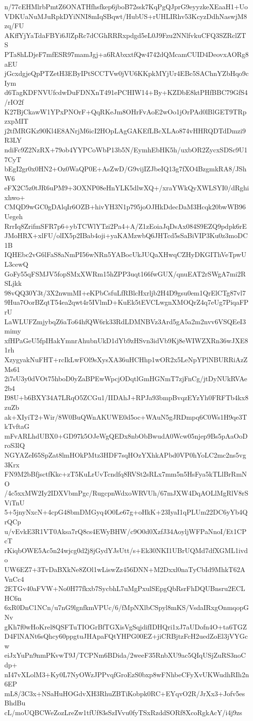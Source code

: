 n/77cEHMlrbPmtZ6ONATHfhsfkep6jboB72ssk7KqPgQJprG9eyyzkeXEaaH1+Uo
VDKUaNuMJuRpkDYiNNI8mIqSBqwt/HubUS+rUHLIRhv53KcyzDdhNaswjM8zq/FU
AKffYjYaTdaFBYi6JlZpRc7dCGhRRRxpdgd5eL0J9Fzu2NNlfvkuCFQ3SZRclZTS
PTa8hLDjeF7mfESR97mamJgj+a6RAbxxtfQw4742dQMcamCUID4DeovxAORg8aEU
jGcxdgjeQpPTZetH3EByIPtSCCTVw0jVU6KKpkMYjUr4EBc5SAChnYZbHqo9cIym
d6TagKDFNVUfcdwDuFDNXnT491ePCHIW14+By+KZDbE8ktPHfBBC79GfS4/rIO2f
K27BjCkawW1YPxPNOrF+QqRKeJm8OHrFvAoE2wOo1jOrPAd0lBlGET9TRpzxpMIT
j2tfMRGKz90Kl4E8ANrjM6icI2HOpLAgGAKEfLBcXLAo874vHHRQDTdDmzi9R3LY
ndiFc9Z2NzRX+79ob4YYPCoWbP13b5N/EymhEbHK5h/uxbOR2ZycxSDSc9U17CyT
bEgI2gr0x0HN2+Oz0WaQP0E+AsZwD/G9vijIZJbeIQ13g7fXO4BzgmkRA8/JShW6
eFX2C5z0tJR6uPM9+3OXNP08eHnYLK5dlwXQ+/xraYWkQyXWLSYI0/dRghixhwo+
CMQD9wGC0gDAlqIr6OZB+hivYH3N1p795joOJHkDdecDaM3Hcqk20bwWB96Uegeh
RrrIq8ZrifmSFR7p6+ybTCWlYTzi2Pa4+A/Z1zEoiaJqDsAx084S9EZQ9pdpk6rE
JMoHRX+xlFU/olIX5p2IBab4oji+yaKAMzwbQ6JHTcd5sSaBiVIP3Ku0z3moDC1B
IQHEbc2vG6lFaS8aNmPI56wNRn5YABocUkJUQaXHwqCZHyDKGIThVeTpwUL3cewQ
GoFy55qFSMJV5fopSMxXWRm15hZPP3uqt166fwGUX/qnuEAT2rSWgA7mi2RSLjkk
98vQQ30Y3t/3X2nwmMI+eKPbCsfuLfRBlcHxrljb2H4D9gsu0em1QrElCTg87vl7
9Hua7OorBZqtT54ea2qwt4r5IVlmD+KuEk5tEVCLwgnXMOQrZ4q7eUg7PiqaFPrU
LaWLUFZmjybqZ6aTo64hfQW6rk33RdLDMNBVz3Ard5gA5a2m2nvv6VSQEeI3mimy
xfHPaGeU5fpIHakYmnrAhubnUkD1dYb9zHSvn3idVb9Kj8eWIWZXRn36wJXE81rh
XzygyakNuFHT+rcIkLwFOl9sXysXA36uHCHhp1wOR2x5LeNpYPlNBURRiAzZMs61
2i7sU3y0dVOt75hboD0yZaBPEwWpcjODqtlGmHGNmT7zjFnCg/jtDyNUkRVAe2b4
I98U+b6BXY34A7LRqO5ZCGu1/IIDAhJ+RPJa93bmpBvqzEYzYh0FRFTb4kx8zuZb
ak+XIyiT2+Wir/8W0BuQWnAKUWE0d5oc+WAuN5gJRDmpq6C0Ws1H9qe3TkTvftaG
mFvARLhdUBX0+GD97k5OJeWgQEDx8nbObBwudA0Wcw05njep9Bs5pAaOoDroS3lQ
NGYAZeI65SpZat8lmHOkPMtz3HDF7sqHOzYXhkAPbd0VP0hYoLC2mc2ns5vg3Krx
FN9M2bBfjsctfKkc+zT5KuLrUvTcndfq8RVSt2sRLx7mm5n5HsFya5kTLlBrRmNO
/4c5xxMW2Iy2IDXVbmPgc/RugcpnWdxoWRVUh/67mJXW4DqAOLlMgRlV8rSViTnU
5+5jnyNxcN+4cpG48bmDMGyq4O0Le67g+oHkK+23IyaI1qPLUm22DC6yYb4QrQCp
u/vEvkE3R1VT0Aksa7rQ8cs4EWyBHW/c9O0d0XzfJ34AoyljWFPaNnoI/Et1CPcT
rKiqbOWE5Ac5n24wjcg0d2j8jGydYJsUtt/s+Ek30NKI1UBrUQMd7dfXGML1ivdo
UW6EZ7+3TvDaBXkNe8ZOl1wLiswZz456DNN+M2Dxxl0naTyCbId9MhkT62AVnCc4
2ETGv40aFVW+No0H77fkxb7SycbhL7uMgPxulSEpgQbRsrFhDQUBnsru2ECLHC6n
6xR0DnC1NCn/u7nG9lgnfkmVPUc/6/fMpNXlbCSpyl8mKS/VsdaIRxgOnmqopGNv
gKh7f0wHoKrel8QSFTuTIOGrBfTGXisVgSqjdifIDHQri1xJ7aUDofn4O+ta6TGZ
D4FlNANt6sQhcy60ppgtuJHApaFQtYHPG00EZ+jiCRBjtzFcH2uedZoEl3jVYGcw
eiJxYuPn9nmPKvwT9J/TCPNm6BDida/2weeF35RnbXU9ac5QIqUSjZuRS3noCdp+
nI47vXLolM3+Ky0L7NyOWzJPPvqfGroEzS0bxp8wFNhbeCFyXvUKWudhRIh2n6EP
mL8/3C3x+NSaHuHOGdvXH3RhuZBTiKobpk0RC+EYqvO2R/JrXx3+Jofv5esBhdBu
cL/moUQBCWeZozLreZw1tfUf83sSzIVvu0fyTSxRzddSORf8XcoRgkAcY/i4j9zs
